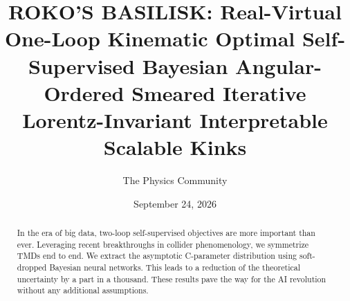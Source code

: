 \documentclass[11pt]{article}
\title{ROKO'S BASILISK: Real-Virtual One-Loop Kinematic Optimal Self-Supervised Bayesian Angular-Ordered Smeared Iterative Lorentz-Invariant Interpretable Scalable Kinks}
\author{The Physics Community}
\date{September 24, 2026}
\numberwithin{equation}{section}
\theoremstyle{definition}
\theoremstyle{remark}
\begin{document}
\maketitle
\begin{abstract}
In the era of big data, two-loop self-supervised objectives are more
important than ever. Leveraging recent breakthroughs in collider
phenomenology, we symmetrize TMDs end to end. We extract the asymptotic
C-parameter distribution using soft-dropped Bayesian neural networks.
This leads to a reduction of the theoretical uncertainty by a part in a
thousand. These results pave the way for the AI revolution without any
additional assumptions.
\end{abstract}
\tableofcontents




\nocite{*}


\end{document}
